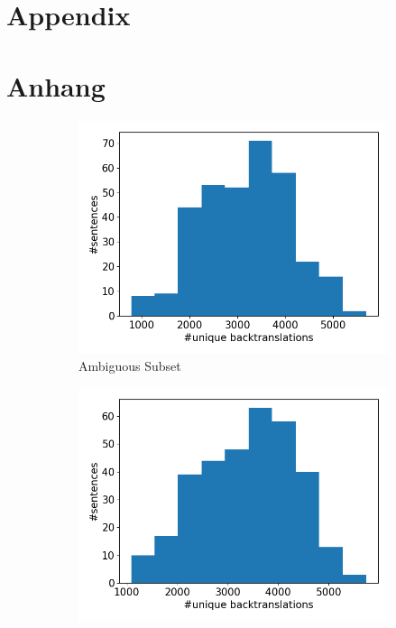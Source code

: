 {\chapter{Appendix}}    %
{\chapter{Anhang}}      %
\label{chap:appendix}

\begin{figure}[!htb]
     \centering
     
     \begin{subfigure}{0.49\textwidth}
         \centering
         \includegraphics[width=\textwidth]{figures/uniqueness/unique_beam100/unique_back_original.png}
         \caption{Ambiguous Subset}
     \end{subfigure}
     \hfill
     \begin{subfigure}{0.49\textwidth}
         \centering
         \includegraphics[width=\textwidth]{figures/uniqueness/unique_beam100/unique_back_male.png}

\end{subfigure}
\end{figure}
